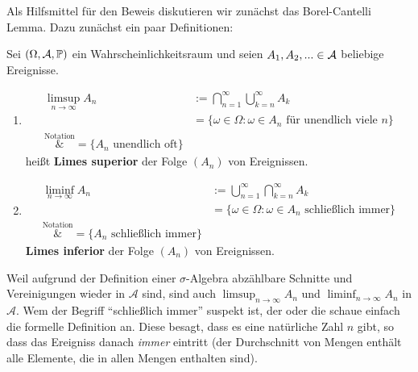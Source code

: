 	
Als Hilfsmittel f\"ur den Beweis diskutieren wir zun\"achst das Borel-Cantelli Lemma. Dazu zun\"achst ein paar Definitionen:	
\begin{deff}
	Sei $(\Omega, \mathcal{A}, \mathbb{P})$ ein Wahrscheinlichkeitsraum und seien $A_1,A_2,... \in \mathcal{A}$ beliebige Ereignisse.
	\begin{enumerate}[label=(\roman*)]
		\item \begin{align*}
			\limsup\limits_{n \to \infty} A_n 
			&:= \bigcap_{n=1}^{\infty} \bigcup_{k=n}^{\infty} A_k\\
			&= \{ \omega \in \Omega\colon \omega \in A_n \text{ für unendlich viele } n \}\\ 
			\overset{\text{Notation}}&{=} \{ A_n \text{ unendlich oft} \} 
		\end{align*}
		heißt \textbf{Limes superior} der Folge $(A_n)$ von Ereignissen.
		\item \begin{align*}
			\liminf\limits_{n \to \infty} A_n 
			&:= \bigcup_{n=1}^{\infty} \bigcap_{k=n}^{\infty} A_k\\
			&= \{ \omega \in \Omega\colon \omega \in A_n \text{ schließlich immer} \}\\
			\overset{\text{Notation}}&{=} \{ A_n \text{ schließlich immer} \}
		\end{align*}
		\textbf{Limes inferior} der Folge $(A_n)$ von Ereignissen.
	\end{enumerate}
\end{deff}
Weil aufgrund der Definition einer $\sigma$-Algebra abz\"ahlbare Schnitte und Vereinigungen wieder in $\mathcal A$ sind, sind auch $\limsup_{n\to\infty} A_n$ und $\liminf_{n\to\infty} A_n$ in $\mathcal A$. Wem der Begriff \enquote{schlie\ss lich immer} suspekt ist, der oder die schaue einfach die formelle Definition an. Diese besagt, dass es eine nat\"urliche Zahl $n$ gibt, so dass das Ereigniss danach \textit{immer} eintritt (der Durchschnitt von Mengen enth\"alt alle Elemente, die in allen Mengen enthalten sind).\smallskip

